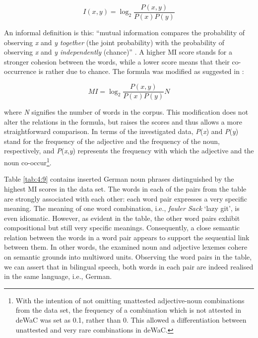 \begin{displaymath}
I(x, y) = \log_2 \frac{P(x,y)}{P(x)P(y)}
\end{displaymath}

\noindent An informal definition is this: ``mutual information compares the probability of observing \textit{x} and \textit{y together} (the joint probability) with the probability of observing \textit{x} and \textit{y independently} (chance)'' \citep[23]{church-hanks-1990}. A higher MI score stands for a stronger cohesion between the words, while a lower score means that their co-occurrence is rather due to chance. The formula was modified as suggested in \citet{wiechmann-2008}:

\begin{displaymath}
 MI = \log_2 \frac{P(x,y)}{P(x)P(y)}N
\end{displaymath}

\noindent where \textit{N} signifies the number of words in the corpus. This modification does not alter the relations in the formula, but raises the scores and thus allows a more straightforward comparison. In terms of the investigated data, \textit{P}(\textit{x}) and \textit{P}(\textit{y}) stand for the frequency of the adjective and the frequency of the noun, respectively, and \textit{P}(\textit{x},\textit{y}) represents the frequency with which the adjective and the noun co-occur\footnote{With the intention of not omitting unattested adjective-noun combinations from the data set, the frequency of a combination which is not attested in deWaC was set as 0.1, rather than 0. This allowed a differentiation between unattested and very rare combinations in deWaC.}.

Table \ref{tab:4:9} contains inserted German noun phrases distinguished by the highest MI scores in the data set. The words in each of the pairs from the table are strongly associated with each other: each word pair expresses a very specific meaning. The meaning of one word combination, i.e., \textit{fauler Sack} `lazy git', is even idiomatic. However, as evident in the table, the other word pairs exhibit compositional but still very specific meanings. Consequently, a close semantic relation between the words in a word pair appears to support the sequential link between them. In other words, the examined noun and adjective lexemes cohere on semantic grounds into multiword units. Observing the word pairs in the table, we can assert that in bilingual speech, both words in each pair are indeed realised in the same language, i.e., German.

